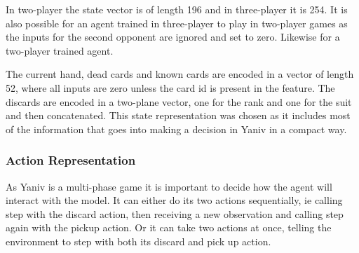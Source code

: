 \documentclass[../main.tex]{subfiles}
\begin{document}
\begin{table}[]
\caption{Yaniv State Encoding}
\label{tab:state-enc}
\end{table}

In two-player the state vector is of length 196 and in three-player it is 254. It is also possible for an agent trained in three-player to play in two-player games as the inputs for the second opponent are ignored and set to zero. Likewise for a two-player trained agent. 

The current hand, dead cards and known cards are encoded in a vector of length 52, where all inputs are zero unless the card id is present in the feature. The discards are encoded in a two-plane vector, one for the rank and one for the suit and then concatenated. This state representation was chosen as it includes most of the information that goes into making a decision in Yaniv in a compact way. 

\subsubsection{Action Representation}

As Yaniv is a multi-phase game it is important to decide how the agent will interact with the model. It can either do its two actions sequentially, ie calling step with the discard action, then receiving a new observation and calling step again with the pickup action. Or it can take two actions at once, telling the environment to step with both its discard and pick up action. 
\end{document}
